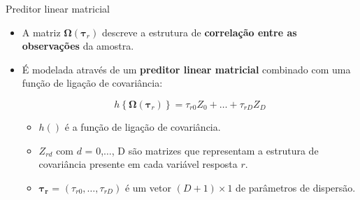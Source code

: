 \documentclass[
  ignorenonframetext,
  serif,
  professionalfont,
  usenames,
  dvipsnames,
  aspectratio = 169]{beamer}
\begin{document}
\begin{frame}{Preditor linear matricial}
\protect\hypertarget{preditor-linear-matricial}{}
\begin{itemize}
  
  \itemsep 2ex
  
  \item A matriz $\boldsymbol{\Omega}(\boldsymbol{\tau}_r)$ descreve a estrutura de \textbf{correlação entre as observações} da amostra.
  
  \item É modelada através de um \textbf{preditor linear matricial} combinado com uma função de ligação de covariância:

$$
h\left \{ \boldsymbol{\Omega}(\boldsymbol{\tau}_r) \right \} = \tau_{r0}Z_0 + \ldots + \tau_{rD}Z_D
$$
  
  \begin{itemize}
  
  \itemsep 2ex
  
  \item $h()$ é a função de ligação de covariância.
  
  \item $Z_{rd}$ com $d$ = 0,$\ldots$, D são matrizes que representam a estrutura de covariância presente em cada variável resposta $r$.
  
  \item $\boldsymbol{\tau_r}$ = $(\tau_{r0}, \ldots, \tau_{rD})$ é um vetor $(D + 1) \times 1$ de parâmetros de dispersão. 
  
\end{itemize}

\end{itemize}
\end{frame}
\end{document}
